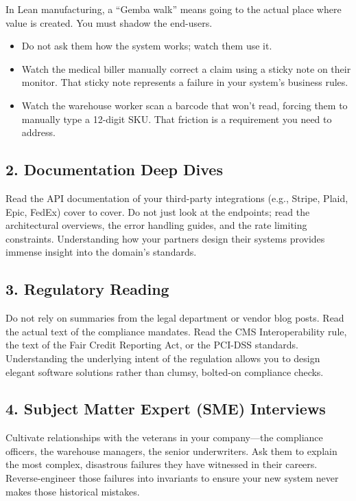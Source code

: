 In Lean manufacturing, a ``Gemba walk'' means going to the actual place
where value is created. You must shadow the end-users.

\begin{itemize}
\tightlist
\item
  Do not ask them how the system works; watch them use it.
\item
  Watch the medical biller manually correct a claim using a sticky note
  on their monitor. That sticky note represents a failure in your
  system's business rules.
\item
  Watch the warehouse worker scan a barcode that won't read, forcing
  them to manually type a 12-digit SKU. That friction is a requirement
  you need to address.
\end{itemize}

\subsection{2. Documentation Deep Dives}\label{documentation-deep-dives}

Read the API documentation of your third-party integrations (e.g.,
Stripe, Plaid, Epic, FedEx) cover to cover. Do not just look at the
endpoints; read the architectural overviews, the error handling guides,
and the rate limiting constraints. Understanding how your partners
design their systems provides immense insight into the domain's
standards.

\subsection{3. Regulatory Reading}\label{regulatory-reading}

Do not rely on summaries from the legal department or vendor blog posts.
Read the actual text of the compliance mandates. Read the CMS
Interoperability rule, the text of the Fair Credit Reporting Act, or the
PCI-DSS standards. Understanding the underlying intent of the regulation
allows you to design elegant software solutions rather than clumsy,
bolted-on compliance checks.

\subsection{4. Subject Matter Expert (SME)
Interviews}\label{subject-matter-expert-sme-interviews}

Cultivate relationships with the veterans in your company---the
compliance officers, the warehouse managers, the senior underwriters.
Ask them to explain the most complex, disastrous failures they have
witnessed in their careers. Reverse-engineer those failures into
invariants to ensure your new system never makes those historical
mistakes.

